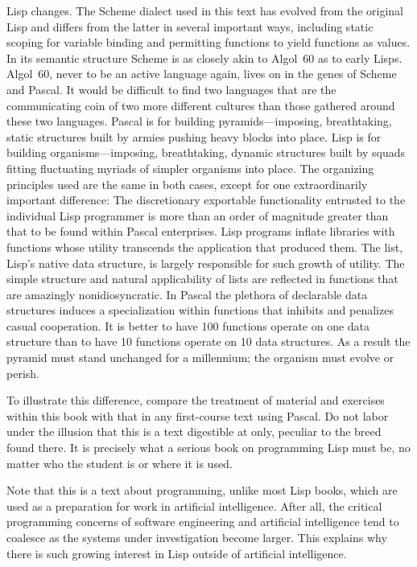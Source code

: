 Lisp changes.
The Scheme dialect used in this text has evolved from the original Lisp and differs from the latter in several important ways, including static scoping for variable binding and permitting functions to yield functions as values.
In its semantic structure Scheme is as closely akin to Algol~60 as to early Lisps.
Algol~60, never to be an active language again, lives on in the genes of Scheme and Pascal.
It would be difficult to find two languages that are the communicating coin of two more different cultures than those gathered around these two languages.
Pascal is for building pyramids---imposing, breathtaking, static structures built by armies pushing heavy blocks into place.
Lisp is for building organisms---imposing, breathtaking, dynamic structures built by squads fitting fluctuating myriads of simpler organisms into place.
The organizing principles used are the same in both cases, except for one extraordinarily important difference:
The discretionary exportable functionality entrusted to the individual Lisp programmer is more than an order of magnitude greater than that to be found within Pascal enterprises.
Lisp programs inflate libraries with functions whose utility transcends the application that produced them.
The list, Lisp’s native data structure, is largely responsible for such growth of utility.
The simple structure and natural applicability of lists are reflected in functions that are amazingly nonidiosyncratic.
In Pascal the plethora of declarable data structures induces a specialization within functions that inhibits and penalizes casual cooperation.
It is better to have 100 functions operate on one data structure than to have 10 functions operate on 10 data structures.
As a result the pyramid must stand unchanged for a millennium;
the organism must evolve or perish.

To illustrate this difference, compare the treatment of material and exercises within this book with that in any first-course text using Pascal.
Do not labor under the illusion that this is a text digestible at  only, peculiar to the breed found there.
It is precisely what a serious book on programming Lisp must be, no matter who the student is or where it is used.

Note that this is a text about programming, unlike most Lisp books, which are used as a preparation for work in artificial intelligence.
After all, the critical programming concerns of software engineering and artificial intelligence tend to coalesce as the systems under investigation become larger.
This explains why there is such growing interest in Lisp outside of artificial intelligence.

